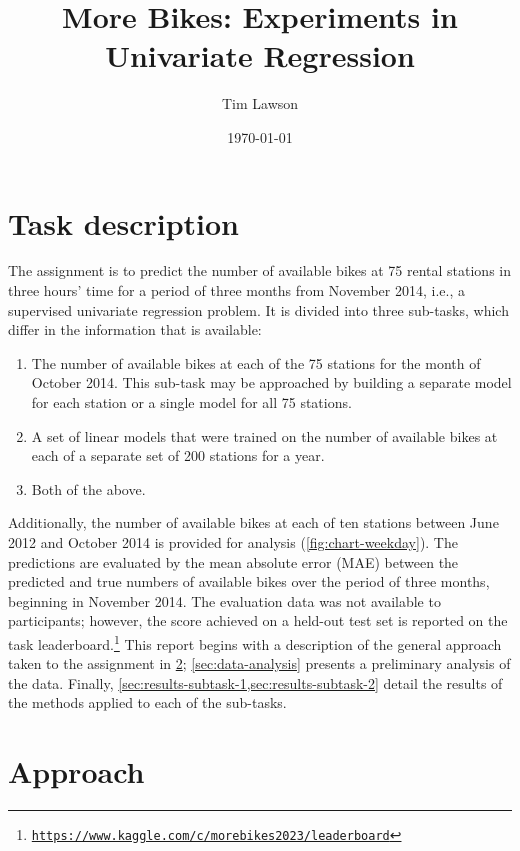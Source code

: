 \documentclass[11pt]{extarticle}
\newcommand{\kaggle}{https://www.kaggle.com/c/morebikes2023/leaderboard}
\begin{document}
\title{More Bikes: Experiments in Univariate Regression}
\author{Tim Lawson}
\date{\today}

\maketitle

\section{Task description}

The assignment is to predict the number of available bikes at 75 rental stations in
three hours' time for a period of three months from November 2014, i.e., a supervised
univariate regression problem.
It is divided into three sub-tasks, which differ in the information that is available:
\begin{enumerate}
  \item The number of available bikes at each of the 75 stations for the month of October 2014.
        This sub-task may be approached by building a separate model for each station or a
        single model for all 75 stations.
  \item A set of linear models that were trained on the number of available bikes at each of a
        separate set of 200 stations for a year.
  \item Both of the above.
\end{enumerate}
Additionally, the number of available bikes at each of ten stations between June 2012
and October 2014 is provided for analysis (\cref{fig:chart-weekday}).
The predictions are evaluated by the mean absolute error (MAE) between the predicted
and true numbers of available bikes over the period of three months, beginning in
November 2014.
The evaluation data was not available to participants; however, the score achieved on a
held-out test set is reported on the task
leaderboard.\footnote{\href{\kaggle}{\texttt{\kaggle}}} This report begins with a
description of the general approach taken to the assignment in \cref{sec:approach};
\cref{sec:data-analysis} presents a preliminary analysis of the data.
Finally, \cref{sec:results-subtask-1,sec:results-subtask-2} detail the results of the
methods applied to each of the sub-tasks.

\section{Approach}
\label{sec:approach}
\end{document}
